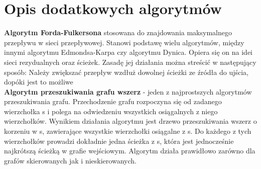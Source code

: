 \documentclass[a4paper,11pt]{article}
\begin{document}
\section{Opis dodatkowych algorytmów}
    \textbf{Algorytm Forda-Fulkersona} stosowana do znajdowania maksymalnego przepływu w sieci przepływowej. Stanowi podstawę wielu algorytmów, między innymi algorytmu Edmondsa-Karpa czy algorytmu Dynica. Opiera się on na idei sieci rezydualnych oraz ścieżek. Zasadę jej działania można streścić w następujący sposób: Należy zwiększać przepływ wzdłuż dowolnej ścieżki ze źródła do ujścia, dopóki jest to możliwe \\
    
    \textbf{Algorytm przeszukiwania grafu wszerz} - jeden z najprostszych algorytmów przeszukiwania grafu. Przechodzenie grafu rozpoczyna się od zadanego wierzchołka s i polega na odwiedzeniu wszystkich osiągalnych z niego wierzchołków. Wynikiem działania algorytmu jest drzewo przeszukiwania wszerz o korzeniu w s, zawierające wszystkie wierzchołki osiągalne z s. Do każdego z tych wierzchołków prowadzi dokładnie jedna ścieżka z s, która jest jednocześnie najkrótszą ścieżką w grafie wejściowym. Algorytm działa prawidłowo zarówno dla grafów skierowanych jak i nieskierowanych.
\newpage
\end{document}
